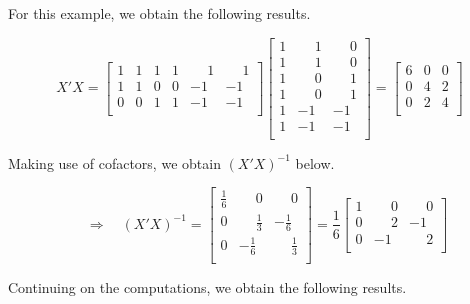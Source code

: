 \documentclass[
]{book}
\begin{document}
For this example, we obtain the following results.

\[ 
X'X = 
\begin{bmatrix}
1 & 1 & 1 & 1 & \phantom{-}1 & \phantom{-}1 \\
1 & 1 & 0 & 0 & -1 & -1 \\
0 & 0 & 1 & 1 & -1 & -1 \\ \end{bmatrix}
\begin{bmatrix}
1 & \phantom{-}1 & \phantom{-}0 \\ 1 & \phantom{-}1 & \phantom{-}0 \\
1 & \phantom{-}0 & \phantom{-}1 \\ 1 & \phantom{-}0 & \phantom{-}1 \\
1 & -1 & -1 \\ 1 & -1 & -1 \\ \end{bmatrix}
= 
\begin{bmatrix}
6 & 0 & 0 \\ 0 & 4 & 2 \\ 0 & 2 & 4 \\ \end{bmatrix}
\]

Making use of cofactors, we obtain \(\left(X'X\right)^{-1}\) below.

\[ 
\quad \Rightarrow \quad \left(X'X\right)^{-1}=
\begin{bmatrix}
\frac{1}{6} & \phantom{-}0 & \phantom{-}0 \\ 
0 & \phantom{-}\frac{1}{3} & -\frac{1}{6} \\ 
0 & -\frac{1}{6} & \phantom{-}\frac{1}{3} \\ \end{bmatrix} =
\frac{1}{6}
\begin{bmatrix}
1 & \phantom{-}0 & \phantom{-}0 \\ 0 & \phantom{-}2 & -1 \\ 0 & -1 & \phantom{-}2 \\
\end{bmatrix}
\]

Continuing on the computations, we obtain the following results.
\end{document}
